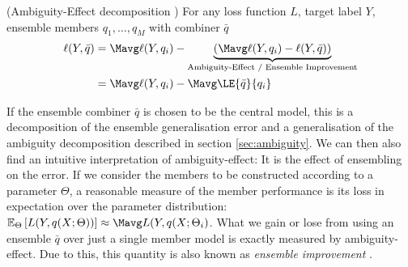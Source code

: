 \documentclass[../main.tex]{subfiles}
\begin{document}
\begin{theorem} \label{thm:ambig-effect-decomp} (Ambiguity-Effect decomposition \cite{todo}) For any loss function $L$, target label $Y$, ensemble members $q_{1}, \dots, q_{M}$ with combiner $\bar{q}$
\begin{align*}
\ell(Y, \bar{q}) &= \Mavg \ell(Y, q_{i}) -
\underbrace{\left(\Mavg \ell(Y, q_{i}) - \ell(Y, \bar{q})\right)}_{\text{Ambiguity-Effect / Ensemble Improvement}} \\
&= \Mavg \ell(Y, q_i) - \Mavg \LE{\bar{q}}{q_i}
\end{align*}
\end{theorem}
If the ensemble combiner $\bar{q}$ is chosen to be the central model, this is a decomposition of the ensemble generalisation error and a generalisation of the ambiguity decomposition described in section \ref{sec:ambiguity}. 
We can then also find an intuitive interpretation of ambiguity-effect: It is the effect of ensembling on the error. If we consider the members to be constructed according to a parameter $\Theta$, a reasonable measure of the member performance is its loss in expectation over the parameter distribution: $\mathbb{E}_{\Theta}\left[ L(Y, q(X; \Theta))  \right] \approx \Mavg L(Y, q(X;\Theta_{i})$. What we gain or lose from using an ensemble $\bar{q}$ over just a single member model is exactly measured by ambiguity-effect. Due to this, this quantity is also known as \textit{ensemble improvement} \cite{theisen, and others?}.




%     



\end{document}
